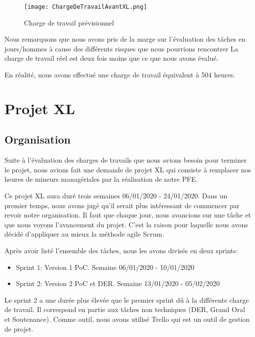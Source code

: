 \begin{figure}[h!]
  \centering
  \texttt{[image: ChargeDeTravailAvantXL.png]}
	\caption[]{Charge de travail prévisionnel}
	\label{}
\end{figure}

Nous remarquons que nous avons pris de la marge sur l'évaluation des tâches en jours/hommes à cause des différents risques que nous pourrions rencontrer
La charge de travail réel est deux fois moins que ce que nous avons évalué. 

En réalité, nous avons effectué une charge de travail équivalent à 504 heures.





\section{Projet XL}

\subsection{Organisation}
Suite à l'évaluation des charges de travails que nous avions besoin pour terminer le projet, nous avions fait une demande de projet XL qui consiste à remplacer nos heures de mineurs managériales par la réalisation de notre PFE\@.

Ce projet XL aura duré trois semaines 06/01/2020 - 24/01/2020.
Dans un premier temps, nous avons jugé qu'il serait plus intéressant de commencer par revoir notre organisation.
Il faut que chaque jour, nous avancions sur une tâche et que nous voyons l'avancement du projet.
C'est la raison pour laquelle nous avons décidé d'appliquer au mieux la méthode agile Scrum.

Après avoir listé l'ensemble des tâches, nous les avons divisés en deux sprints:

\begin{itemize}
    \item Sprint 1:
    Version 1 PoC.
    Semaine 06/01/2020 - 10/01/2020 
    \item Sprint 2:
    Version 2 PoC et DER\@.
    Semaine 13/01/2020 - 05/02/2020
\end{itemize}

Le sprint 2 a une durée plus élevée que le premier sprint dû à la différente charge de travail.
Il correspond en partie aux tâches non techniques (DER, Grand Oral et Soutenance). 
Comme outil, nous avons utilisé Trello qui est un outil de gestion de projet.  


